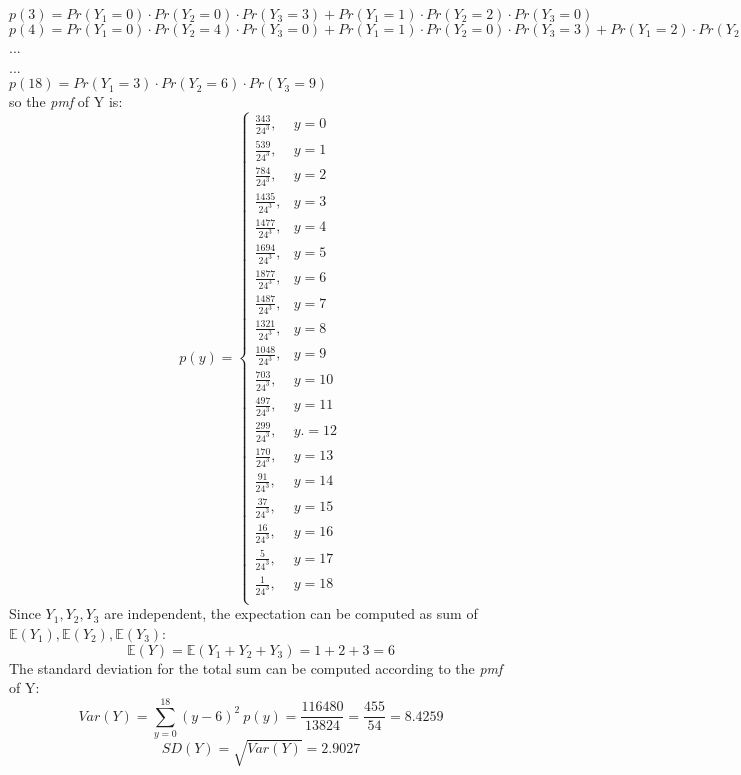 \documentclass[11pt]{article}
\begin{document}
\begin{enumerate}[label=\textbf{Question \arabic*:},start=1]
\begin{enumerate}
$p(3) = Pr(Y_1=0) \cdot Pr(Y_2=0) \cdot Pr(Y_3=3) + Pr(Y_1=1) \cdot Pr(Y_2=2) \cdot Pr(Y_3=0)$\\
$p(4) = Pr(Y_1=0) \cdot Pr(Y_2=4) \cdot Pr(Y_3=0) + Pr(Y_1=1) \cdot Pr(Y_2=0) \cdot Pr(Y_3=3) + Pr(Y_1=2) \cdot Pr(Y_2=2) \cdot Pr(Y_3=0)$\\
...\\
...\\
$p(18) = Pr(Y_1=3) \cdot Pr(Y_2=6) \cdot Pr(Y_3=9)$\\
so the \textit{pmf} of Y is:
\[
    p(y) = \begin{cases}
        \frac{343}{24^3}, & y = 0\\
        \frac{539}{24^3}, & y = 1\\
        \frac{784}{24^3}, & y = 2\\
        \frac{1435}{24^3} , & y = 3\\
        \frac{1477}{24^3}, & y = 4\\
        \frac{1694}{24^3}, & y = 5\\
        \frac{1877}{24^3}, & y = 6\\
        \frac{1487}{24^3}, & y = 7\\
        \frac{1321}{24^3}, & y = 8\\
        \frac{1048}{24^3}, & y = 9\\
        \frac{703}{24^3}, & y = 10\\
        \frac{497}{24^3}, & y = 11\\
        \frac{299}{24^3}, & y. = 12\\
        \frac{170}{24^3}, & y = 13\\
        \frac{91}{24^3}, & y = 14\\
        \frac{37}{24^3}, & y = 15\\
        \frac{16}{24^3}, & y = 16\\
        \frac{5}{24^3}, & y = 17\\
        \frac{1}{24^3}, & y = 18\\
        \end{cases}
\]
Since $Y_1, Y_2, Y_3$ are independent, the expectation can be computed as sum of \( \mathbb{E}(Y_1), \mathbb{E}(Y_2), \mathbb{E}(Y_3) \):
\[
\mathbb{E}(Y) = \mathbb{E}(Y_1 + Y_2 + Y_3) = 1 + 2 + 3 = 6
\]
The standard deviation for the total sum can be computed according to the \textit{pmf} of Y:
\[
Var(Y) = \sum_{y=0}^{18} (y-6)^2\ p(y) = \frac{116480}{13824} = \frac{455}{54} = 8.4259
\]
\[
SD(Y) = \sqrt{Var(Y)} = 2.9027
\] 
\end{enumerate}




\end{enumerate}
\end{document}
